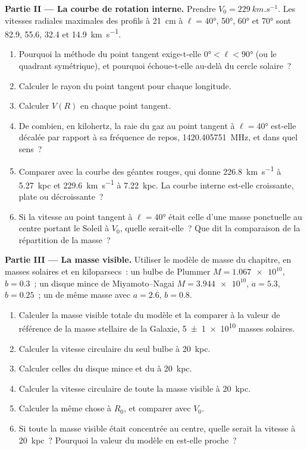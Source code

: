 \begin{problem}
\medskip\noindent\textbf{Partie II --- La courbe de rotation interne.} Prendre
$V_0 = \qty{229}{km.s^{-1}}$. Les vitesses radiales maximales des
profils à 21~cm à $\ell = \ang{40}$, \ang{50}, \ang{60} et \ang{70} sont
82.9, 55.6, 32.4 et \qty{14.9}{km.s^{-1}}.
\begin{enumerate}[resume]
\item Pourquoi la méthode du point tangent exige-t-elle $\ang{0} < \ell < \ang{90}$
  (ou le quadrant symétrique), et pourquoi échoue-t-elle au-delà du cercle solaire~?
\item Calculer le rayon du point tangent pour chaque longitude.
\item Calculer $V(R)$ en chaque point tangent.
\item De combien, en kilohertz, la raie du gaz au point tangent
  à $\ell = \ang{40}$ est-elle décalée par rapport à sa fréquence de repos,
  \qty{1420.405751}{MHz}, et dans quel sens~?
\item Comparer avec la courbe des géantes rouges, qui donne \qty{226.8}{km.s^{-1}}
  à \qty{5.27}{kpc} et \qty{229.6}{km.s^{-1}} à \qty{7.22}{kpc}. La courbe
  interne est-elle croissante, plate ou décroissante~?
\item Si la vitesse au point tangent à $\ell = \ang{40}$ était celle d'une
  masse ponctuelle au centre portant le Soleil à $V_0$, quelle serait-elle~?
  Que dit la comparaison de la répartition de la masse~?
\end{enumerate}

\medskip\noindent\textbf{Partie III --- La masse visible.} Utiliser le modèle de
masse du chapitre, en masses solaires et en kiloparsecs~: un
bulbe de Plummer $M = \num{1.067e10}$, $b = 0.3$~; un disque mince de Miyamoto--Nagai
$M = \num{3.944e10}$, $a = 5.3$, $b = 0.25$~; un  de même
masse avec $a = 2.6$, $b = 0.8$.
\begin{enumerate}[resume]
\item Calculer la masse visible totale du modèle et la comparer à la
  valeur de référence de la masse stellaire de la Galaxie, \qty[separate-uncertainty=true]{5 \pm 1 e10}{} masses
  solaires.
\item Calculer la vitesse circulaire du seul bulbe à \qty{20}{kpc}.
\item Calculer celles du disque mince et du  à \qty{20}{kpc}.
\item Calculer la vitesse circulaire de toute la masse visible à
  \qty{20}{kpc}.
\item Calculer la même chose à $R_0$, et comparer avec $V_0$.
\item Si toute la masse visible était concentrée au centre, quelle serait
  la vitesse à \qty{20}{kpc}~? Pourquoi la valeur du modèle en est-elle proche~?
\end{enumerate}


\end{problem}
